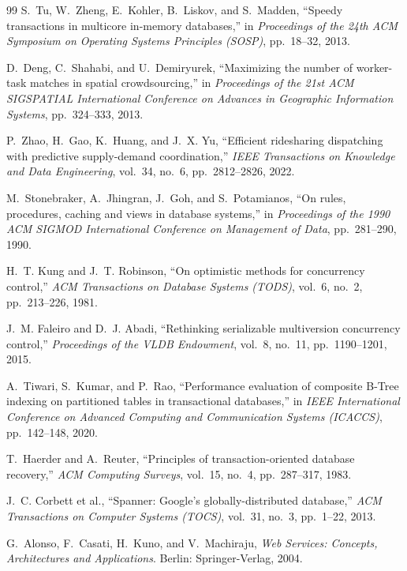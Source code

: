 \documentclass[conference]{IEEEtran}
\begin{document}
\begin{thebibliography}{99}
S.~Tu, W.~Zheng, E.~Kohler, B.~Liskov, and S.~Madden, ``Speedy transactions in multicore in-memory databases,'' in \emph{Proceedings of the 24th ACM Symposium on Operating Systems Principles (SOSP)}, pp.~18--32, 2013.

D.~Deng, C.~Shahabi, and U.~Demiryurek, ``Maximizing the number of worker-task matches in spatial crowdsourcing,'' in \emph{Proceedings of the 21st ACM SIGSPATIAL International Conference on Advances in Geographic Information Systems}, pp.~324--333, 2013.

P.~Zhao, H.~Gao, K.~Huang, and J.~X. Yu, ``Efficient ridesharing dispatching with predictive supply-demand coordination,'' \emph{IEEE Transactions on Knowledge and Data Engineering}, vol.~34, no.~6, pp.~2812--2826, 2022.

M.~Stonebraker, A.~Jhingran, J.~Goh, and S.~Potamianos, ``On rules, procedures, caching and views in database systems,'' in \emph{Proceedings of the 1990 ACM SIGMOD International Conference on Management of Data}, pp.~281--290, 1990.

H.~T. Kung and J.~T. Robinson, ``On optimistic methods for concurrency control,'' \emph{ACM Transactions on Database Systems (TODS)}, vol.~6, no.~2, pp.~213--226, 1981.

J.~M. Faleiro and D.~J. Abadi, ``Rethinking serializable multiversion concurrency control,'' \emph{Proceedings of the VLDB Endowment}, vol.~8, no.~11, pp.~1190--1201, 2015.

A.~Tiwari, S.~Kumar, and P.~Rao, ``Performance evaluation of composite B-Tree indexing on partitioned tables in transactional databases,'' in \emph{IEEE International Conference on Advanced Computing and Communication Systems (ICACCS)}, pp.~142--148, 2020.

T.~Haerder and A.~Reuter, ``Principles of transaction-oriented database recovery,'' \emph{ACM Computing Surveys}, vol.~15, no.~4, pp.~287--317, 1983.

J.~C. Corbett et al., ``Spanner: Google's globally-distributed database,'' \emph{ACM Transactions on Computer Systems (TOCS)}, vol.~31, no.~3, pp.~1--22, 2013.

G.~Alonso, F.~Casati, H.~Kuno, and V.~Machiraju, \emph{Web Services: Concepts, Architectures and Applications}. Berlin: Springer-Verlag, 2004.


\end{thebibliography}
\end{document}
